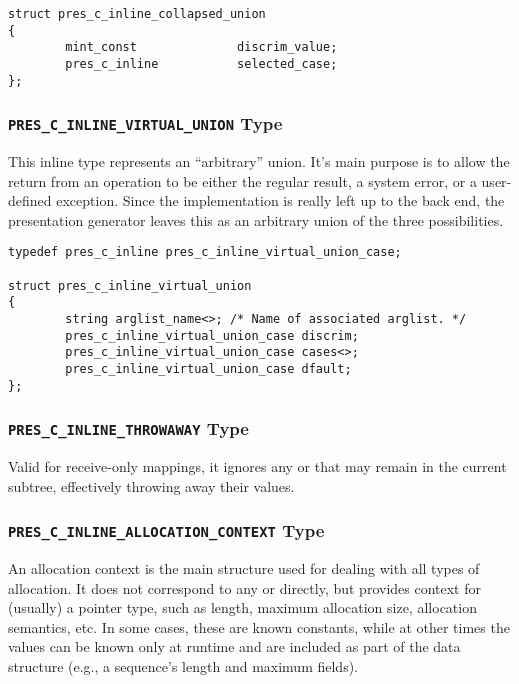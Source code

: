 \begin{verbatim}
struct pres_c_inline_collapsed_union
{
        mint_const              discrim_value;
        pres_c_inline           selected_case;
};
\end{verbatim}

\subsubsection{\texttt{PRES\_C\_INLINE\_VIRTUAL\_UNION} Type}

This inline type represents an ``arbitrary'' union.  It's main purpose is to
allow the return from an operation to be either the regular result, a system
error, or a user-defined exception.  Since the implementation is really left up
to the back end, the presentation generator leaves this as an arbitrary union
of the three possibilities.

\begin{verbatim}
typedef pres_c_inline pres_c_inline_virtual_union_case;

struct pres_c_inline_virtual_union
{
        string arglist_name<>; /* Name of associated arglist. */
        pres_c_inline_virtual_union_case discrim;
        pres_c_inline_virtual_union_case cases<>;
        pres_c_inline_virtual_union_case dfault;
};
\end{verbatim}

\subsubsection{\texttt{PRES\_C\_INLINE\_THROWAWAY} Type}

Valid for receive-only mappings, it ignores any \MINT{} or \CAST{} that may
remain in the current subtree, effectively throwing away their values.

\subsubsection{\texttt{PRES\_C\_INLINE\_ALLOCATION\_CONTEXT} Type}

An allocation context is the main structure used for dealing with all types of
allocation.  It does not correspond to any \MINT{} or \CAST{} directly, but
provides context for (usually) a pointer type, such as length, maximum
allocation size, allocation semantics, etc.  In some cases, these are known
constants, while at other times the values can be known only at runtime and are
included as part of the data structure (e.g., a \CORBA{} sequence's length and
maximum fields).


